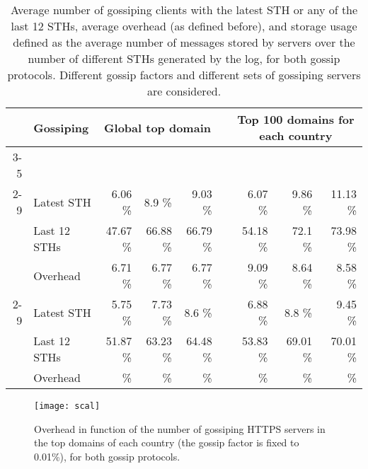 \begin{table*}
\centering
\small
\renewcommand{\arraystretch}{0.95}

\begin{tabular}{@{}rm{60pt}rrrcrrr@{}}
\toprule
&\multirow{2}{*}{\vspace{-0.35em}Gossiping} & \multicolumn{3}{c}{Global top domain} & \phantom{abc} & \multicolumn{3}{c}{Top 100 domains for each country} \\
\cmidrule{3-5} \cmidrule{7-9}
&&  &  &  &&  &  &  \\
\cmidrule{2-9}
\multirow{3}{*}{\begin{turn}{90}Prot. 1\end{turn}} & Latest STH & 6.06 \% & 8.9 \% & 9.03 \% && 6.07 \% & 9.86 \% & 11.13 \% \\
& Last 12 STHs & 47.67 \% & 66.88 \% & 66.79 \% && 54.18 \% & 72.1 \% & 73.98 \% \\
& Overhead & 6.71 \% & 6.77 \% & 6.77 \% && 9.09 \% & 8.64 \% & 8.58 \% \\
\cmidrule{2-9}
\multirow{3}{*}{\begin{turn}{90}Prot. 2\end{turn}} & Latest STH & 5.75 \% & 7.73 \% & 8.6 \% && 6.88 \% & 8.8 \% & 9.45 \% \\
& Last 12 STHs & 51.87 \% & 63.23 \% & 64.48 \% && 53.83 \% & 69.01 \% & 70.01 \% \\
& Overhead &  \% &  \% &  \% &&  \% &  \% &  \% \\
\bottomrule
\end{tabular}

\smallskip{}
\caption{Average number of gossiping clients with the latest STH or any of the last 12 STHs, average overhead (as defined before), and storage usage defined as the average number of messages stored by servers over the number of different STHs generated by the log, for both gossip protocols. Different gossip factors  and different sets of gossiping servers are considered.}
\label{tab:scalability}
\end{table*}

\begin{figure}
\centering
\texttt{[image: scal]}
\caption{Overhead in function of the number of gossiping HTTPS servers in the top  domains of each country (the gossip factor is fixed to 0.01\%), for both gossip protocols.}
\label{fig:scalability}
\end{figure}
